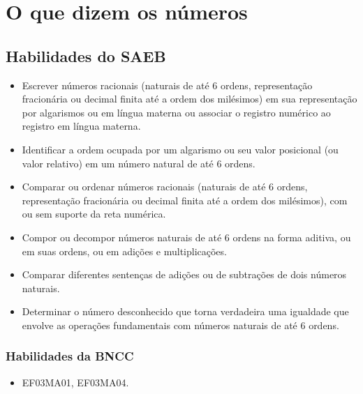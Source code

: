 \chapter{O que dizem os números}

\vspace*{-1cm}

\section*{Habilidades do SAEB}


\begin{itemize}
  \item Escrever números racionais (naturais de até 6 ordens, representação
fracionária ou decimal finita até a ordem dos milésimos) em sua
representação por algarismos ou em língua materna ou associar o registro
numérico ao registro em língua materna.

  \item Identificar a ordem ocupada por um algarismo ou seu valor posicional
(ou valor relativo) em um número natural de até 6 ordens.

  \item Comparar ou ordenar números racionais (naturais de até 6 ordens,
representação fracionária ou decimal finita até a ordem dos milésimos),
com ou sem suporte da reta numérica.

  \item Compor ou decompor números naturais de até 6 ordens na forma aditiva,
ou em suas ordens, ou em adições e multiplicações.

  \item Comparar diferentes sentenças de adições ou de subtrações de dois
números naturais.

  \item Determinar o número desconhecido que torna verdadeira uma igualdade
que envolve as operações fundamentais com números naturais de até 6
ordens.
\end{itemize}


\subsection{Habilidades da BNCC}

\begin{itemize}
\item EF03MA01, EF03MA04.
\end{itemize}

